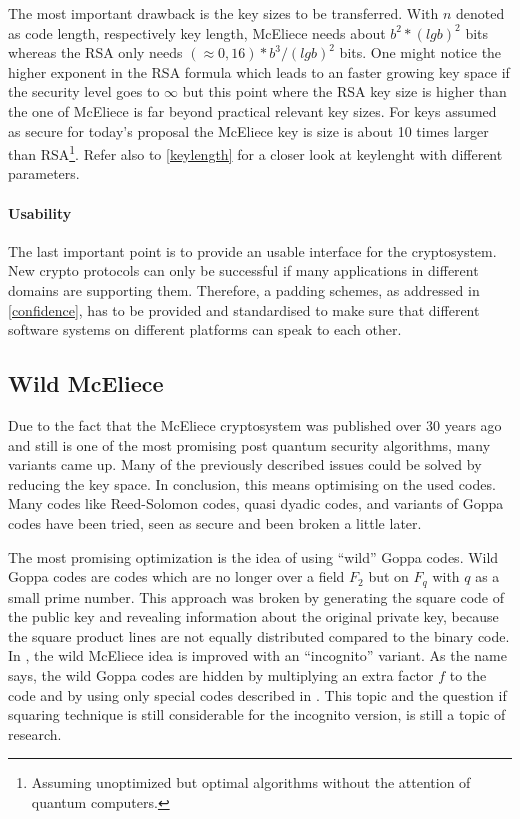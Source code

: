 The most important drawback is the key sizes to be transferred. With $n$ denoted as code length, respectively key length, McEliece needs about $b^2*(lg b)^2$ bits whereas the RSA only needs $(\approx 0,16)*b^3/(lg b)^2$ bits. One might notice the higher exponent in the RSA formula which leads to an faster growing key space if the security level goes to $\infty$ but this point where the RSA key size is higher than the one of McEliece is far beyond practical relevant key sizes. For keys assumed as secure for today’s proposal the McEliece key is size is about 10 times larger than RSA\footnote{Assuming unoptimized but optimal algorithms without the attention of quantum computers.}. Refer also to \autoref{keylength} for a closer look at keylenght with different parameters.\cite{bernstein2009introduction}

\paragraph*{Usability}
The last important point is to provide an usable interface for the cryptosystem. New crypto protocols can only be successful if many applications in different domains are supporting them. Therefore, a padding schemes, as addressed in \autoref{confidence}, has to be provided and standardised to make sure that different software systems on different platforms can speak to each other. \cite{bernstein2009introduction}

\subsection*{Wild McEliece} %
Due to the fact that the McEliece cryptosystem was published over 30 years ago and still is one of the most promising post quantum security algorithms, many variants came up. Many of the previously described issues could be solved by reducing the key space. In conclusion, this means optimising on the used codes. Many codes like Reed-Solomon codes, quasi dyadic codes, and variants of Goppa codes have been tried, seen as secure and been broken a little later. 

The most promising optimization is the idea of using ``wild'' Goppa codes\cite{bernstein2010wild}. Wild Goppa codes are codes which are no longer over a field $F_2$ but on $F_q$ with $q$ as a small prime number. This approach was broken by generating the square code of the public key and revealing information about the original private key, because the square product lines are not equally distributed compared to the binary code. In \cite{yang2011post}, the wild McEliece idea is improved with an ``incognito'' variant. As the name says, the wild Goppa codes are hidden by multiplying an extra factor $f$ to the code and by using only special codes described in \cite{berger2005mask}. This topic and the question if squaring technique is still considerable for the incognito version, is still a topic of research. 



